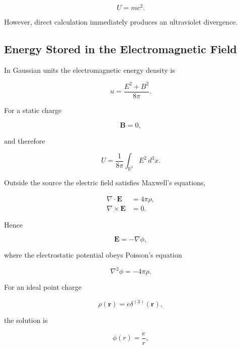 \begin{enumerate}
\begin{equation}
U = mc^2.
\end{equation}

However, direct calculation immediately produces an ultraviolet divergence.

\subsection{Energy Stored in the Electromagnetic Field}

In Gaussian units the electromagnetic energy density is

\begin{equation}
u
=
\frac{E^2+B^2}{8\pi}.
\end{equation}

For a static charge

\begin{equation}
\mathbf B=0,
\end{equation}

and therefore

\begin{equation}
U
=
\frac1{8\pi}
\int_{\mathbb R^3}
E^2\,d^3x.
\end{equation}

Outside the source the electric field satisfies Maxwell's equations,

\begin{align}
\nabla\cdot\mathbf E &=4\pi\rho,
\\
\nabla\times\mathbf E &=0.
\end{align}

Hence

\begin{equation}
\mathbf E=-\nabla\phi,
\end{equation}

where the electrostatic potential obeys Poisson's equation

\begin{equation}
\nabla^2\phi
=
-4\pi\rho.
\end{equation}

For an ideal point charge

\begin{equation}
\rho(\mathbf r)
=
e\delta^{(3)}(\mathbf r),
\end{equation}

the solution is

\begin{equation}
\phi(r)
=
\frac{e}{r},
\end{equation}


\end{enumerate}
